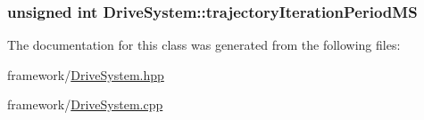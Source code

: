 \hypertarget{classDriveSystem_a718e69f0338b27d50e79d698886aa744}{
\subsubsection[{trajectory\-Iteration\-Period\-M\-S}]{\setlength{\rightskip}{0pt plus 5cm}unsigned int Drive\-System\-::trajectory\-Iteration\-Period\-M\-S\hspace{0.3cm}{\ttfamily [protected]}}}\label{classDriveSystem_a718e69f0338b27d50e79d698886aa744}


The documentation for this class was generated from the following files\-:\begin{DoxyCompactItemize}
\item 
framework/\hyperlink{DriveSystem_8hpp}{Drive\-System.\-hpp}\item 
framework/\hyperlink{DriveSystem_8cpp}{Drive\-System.\-cpp}\end{DoxyCompactItemize}
